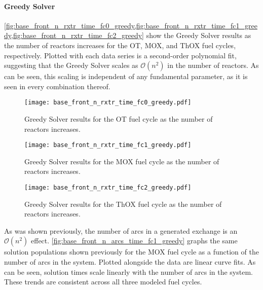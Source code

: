 \paragraph{Greedy Solver}

\cref{fig:base_front_n_rxtr_time_fc0_greedy,fig:base_front_n_rxtr_time_fc1_greedy,fig:base_front_n_rxtr_time_fc2_greedy}
show the Greedy Solver results as the number of reactors increases for the OT,
MOX, and ThOX fuel cycles, respectively. Plotted with each data series is a
second-order polynomial fit, suggesting that the Greedy Solver scales as
$\mathcal{O}(n^2)$ in the number of reactors. As can be seen, this scaling is
independent of any fundamental parameter, as it is seen in every combination
thereof.

\begin{figure}[h!]
  \begin{center}
    \texttt{[image: base\_front\_n\_rxtr\_time\_fc0\_greedy.pdf]}
    \caption[]{
      \label{fig:base_front_n_rxtr_time_fc0_greedy}
      Greedy Solver results for the OT fuel cycle as the number of reactors
      increases.  }
  \end{center}
\end{figure}

\begin{figure}[h!]
  \begin{center}
    \texttt{[image: base\_front\_n\_rxtr\_time\_fc1\_greedy.pdf]}
    \caption[]{
      \label{fig:base_front_n_rxtr_time_fc1_greedy}
      Greedy Solver results for the MOX fuel cycle as the number of reactors
      increases.
    }
  \end{center}
\end{figure}

\begin{figure}[h!]
  \begin{center}
    \texttt{[image: base\_front\_n\_rxtr\_time\_fc2\_greedy.pdf]}
    \caption[]{
      \label{fig:base_front_n_rxtr_time_fc2_greedy}
      Greedy Solver results for the ThOX fuel cycle as the number of reactors
      increases.
      }
  \end{center}
\end{figure}

As was shown previously, the number of arcs in a generated exchange is an
$\mathcal{O}(n^2)$ effect. \ref{fig:base_front_n_arcs_time_fc1_greedy}
graphs the same solution populations shown previously for the MOX fuel cycle as
a function of the number of arcs in the system. Plotted alongside the data are
linear curve fits. As can be seen, solution times scale linearly with the number
of arcs in the system. These trends are consistent across all three modeled fuel
cycles.

